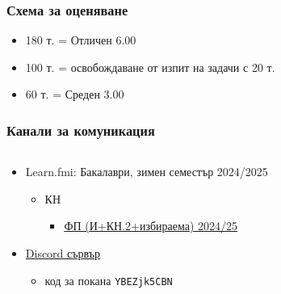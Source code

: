 \documentclass[alsotrans]{beamerswitch}
\begin{document}
\begin{frame}
  \frametitle{Схема за оценяване}

  \begin{itemize}
  \item 180 т. = Отличен 6.00
  \item 100 т. = освобождаване от изпит на задачи с 20 т.
  \item 60 т. = Среден 3.00
  \end{itemize}
\end{frame}

\begin{frame}
  \frametitle{Канали за комуникация}
          \begin{columns}[T,onlytextwidth]
            \begin{column}{.7\textwidth}
            \begin{itemize}
            \item Learn.fmi: Бакалаври, зимен семестър 2024/2025
              \begin{itemize}
              \item КН
                \begin{itemize}
                \item \href{https://learn.fmi.uni-sofia.bg/course/view.php?id=10481}{ФП (И+КН.2+избираема) 2024/25}
                \end{itemize}
              \end{itemize}
              \vspace{7ex}
            \item \href{https://discord.gg/YBEZjk5CBN}{Discord сървър}
              \begin{itemize}
              \item код за покана \tt{YBEZjk5CBN}
              \end{itemize}
            \end{itemize}              
          \end{column}
          \begin{column}{.3\textwidth}
            
            \vspace{4ex}
          \end{column}
          \end{columns}
        \end{frame}
\end{document}
